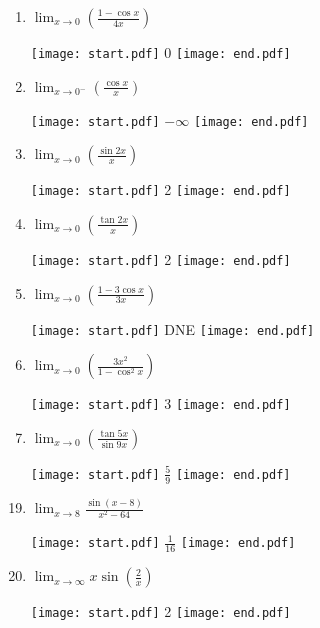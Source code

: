 \documentclass[12pt]{article}
\begin{document}
\begin{enumerate}
\item $\displaystyle \lim_{x\rightarrow 0}{\left(\frac{1-\cos{x}}{4x}\right)}$

\texttt{[image: start.pdf]}
{{$0$}}
\texttt{[image: end.pdf]}


\item $\displaystyle \lim_{x\rightarrow 0^-}{\left(\frac{\cos x}{x}\right)}$ 

\texttt{[image: start.pdf]}
{{$-\infty$}}
\texttt{[image: end.pdf]}


\item $\displaystyle \lim_{x\rightarrow 0}{\left(\frac{\sin 2x}{x}\right)}$

\texttt{[image: start.pdf]}
{{2}}
\texttt{[image: end.pdf]}


\item $\displaystyle \lim_{x\rightarrow 0}{\left(\frac{\tan 2x}{x}\right)}$

\texttt{[image: start.pdf]}
{{2}}
\texttt{[image: end.pdf]}


\item $\displaystyle \lim_{x\rightarrow 0}{\left(\frac{1-3\cos{x}}{3x}\right)}$

\texttt{[image: start.pdf]}
{{DNE}}
\texttt{[image: end.pdf]}


\item $\displaystyle \lim_{x\rightarrow 0}{\left(\frac{3x^2}{1-\cos^2{x}}\right)}$

\texttt{[image: start.pdf]}
{{3}}
\texttt{[image: end.pdf]}


\item $\displaystyle \lim_{x \rightarrow 0}{\left(\frac{\tan{5x}}{\sin{9x}}\right)}$

\texttt{[image: start.pdf]}
{{$\displaystyle \frac{5}{9}$}}
\texttt{[image: end.pdf]}


\end{enumerate}


\begin{enumerate}
\setcounter{enumi}{18}

\item $\displaystyle \lim_{x\to 8}\frac{\sin(x-8)}{x^2-64}$

\texttt{[image: start.pdf]}
{{$\frac{1}{16}$}}
\texttt{[image: end.pdf]}


\item $\displaystyle \lim_{x\to \infty}x\sin\left(\frac{2}{x}\right)$

\texttt{[image: start.pdf]}
{2}
\texttt{[image: end.pdf]}


\end{enumerate}
\end{document}
